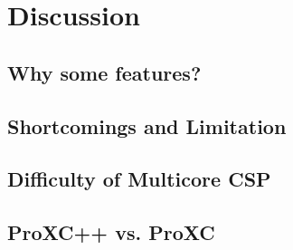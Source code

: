 

\chapter{Discussion}
\label{ch:discussion}

\section{Why some features?}

\section{Shortcomings and Limitation}


\section{Difficulty of Multicore CSP}


\section{ProXC++ vs. ProXC}


